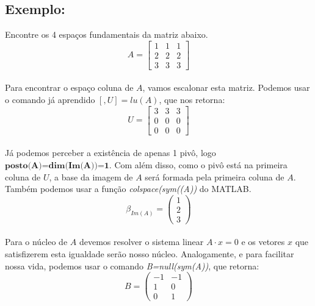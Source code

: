 \documentclass[12pt]{article}
\begin{document}
\subsection{Exemplo:}

Encontre os 4 espaços fundamentais da matriz abaixo.
\begin{equation*}
	A= 
	\begin{bmatrix}
		1 & 1 & 1\\
		2 & 2 & 2\\
		3 & 3 & 3
	\end{bmatrix}	
\end{equation*}\\

Para encontrar o espaço coluna de $A$, vamos escalonar esta matriz. Podemos usar o comando já aprendido $[,U]=lu(A)$, que nos retorna:
\begin{equation*}
	U= 
	\begin{bmatrix}
		3 & 3 & 3\\
		0 & 0 & 0\\
		0 & 0 & 0
	\end{bmatrix}	
\end{equation*}\\

Já podemos perceber a existência de apenas 1 pivô, logo $\textbf{posto(A)=dim(Im(A))=1}$. Com além disso, como o pivô está na primeira coluna de $U$, a base da imagem de $A$ será formada pela primeira coluna de $A$. Também podemos usar a função \textit{colspace(sym((A))} do MATLAB.
\begin{equation*}
	\beta_{Im(A)}= 
	\begin{pmatrix}
		1\\
		2\\
		3
	\end{pmatrix}	
\end{equation*}\\

Para o núcleo de $A$ devemos resolver o sistema linear $A\cdot x=0$ e os vetores $x$ que satisfizerem esta igualdade serão nosso núcleo. Analogamente, e para facilitar nossa vida, podemos usar o comando \textit{B=null(sym(A))}, que retorna:
\begin{equation*}
	B=
	\begin{pmatrix}
		-1 & -1\\
		1 & 0\\
		0 & 1
	\end{pmatrix}	
\end{equation*}\\
\end{document}
